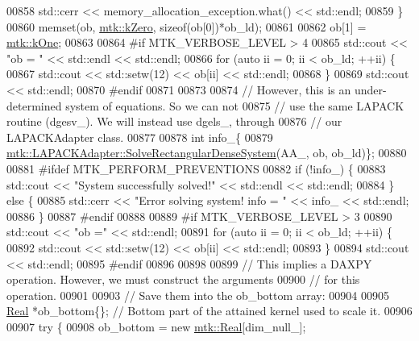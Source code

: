 \begin{DoxyCode}
{{00858       std::cerr << memory\_allocation\_exception.what() << std::endl;
00859     \}
00860     memset(ob, \hyperlink{group__c01-roots_ga59a451a5fae30d59649bcda274fea271}{mtk::kZero}, \textcolor{keyword}{sizeof}(ob[0])*ob\_ld);
00861 
00862     ob[1] = \hyperlink{group__c01-roots_ga26407c24d43b6b95480943340d285c71}{mtk::kOne};
00863 
00864 \textcolor{preprocessor}{    #if MTK\_VERBOSE\_LEVEL > 4}
00865     std::cout << \textcolor{stringliteral}{"ob = "} << std::endl << std::endl;
00866     \textcolor{keywordflow}{for} (\textcolor{keyword}{auto} ii = 0; ii < ob\_ld; ++ii) \{
00867       std::cout << std::setw(12) << ob[ii] << std::endl;
00868     \}
00869     std::cout << std::endl;
00870 \textcolor{preprocessor}{    #endif}
00871 
00873 
00874     \textcolor{comment}{// However, this is an under-determined system of equations. So we can not}
00875     \textcolor{comment}{// use the same LAPACK routine (dgesv\_). We will instead use dgels\_, through}
00876     \textcolor{comment}{// our LAPACKAdapter class.}
00877 
00878     \textcolor{keywordtype}{int} info\_\{
00879       \hyperlink{classmtk_1_1LAPACKAdapter_a380f148ffdf96bae2f79ae28f1a6560c}{mtk::LAPACKAdapter::SolveRectangularDenseSystem}(AA\_, 
      ob, ob\_ld)\};
00880 
00881 \textcolor{preprocessor}{    #ifdef MTK\_PERFORM\_PREVENTIONS}
00882     \textcolor{keywordflow}{if} (!info\_) \{
00883       std::cout << \textcolor{stringliteral}{"System successfully solved!"} << std::endl << std::endl;
00884     \} \textcolor{keywordflow}{else} \{
00885       std::cerr << \textcolor{stringliteral}{"Error solving system! info = "} << info\_ << std::endl;
00886     \}
00887 \textcolor{preprocessor}{    #endif}
00888 
00889 \textcolor{preprocessor}{    #if MTK\_VERBOSE\_LEVEL > 3}
00890     std::cout << \textcolor{stringliteral}{"ob ="} << std::endl;
00891     \textcolor{keywordflow}{for} (\textcolor{keyword}{auto} ii = 0; ii < ob\_ld; ++ii) \{
00892       std::cout << std::setw(12) << ob[ii] << std::endl;
00893     \}
00894     std::cout << std::endl;
00895 \textcolor{preprocessor}{    #endif}
00896 
00898 
00899     \textcolor{comment}{// This implies a DAXPY operation. However, we must construct the arguments}
00900     \textcolor{comment}{// for this operation.}
00901 
00903     \textcolor{comment}{// Save them into the ob\_bottom array:}
00904 
00905     \hyperlink{group__c01-roots_gac080bbbf5cbb5502c9f00405f894857d}{Real} *ob\_bottom\{\}; \textcolor{comment}{// Bottom part of the attained kernel used to scale it.}
00906 
00907     \textcolor{keywordflow}{try} \{
00908       ob\_bottom = \textcolor{keyword}{new} \hyperlink{group__c01-roots_gac080bbbf5cbb5502c9f00405f894857d}{mtk::Real}[dim\_null\_];
}}
\end{DoxyCode}
